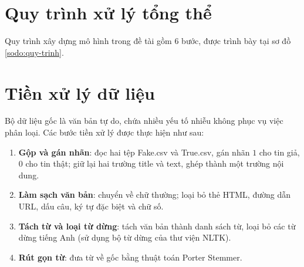 \section{Quy trình xử lý tổng thể}

Quy trình xây dựng mô hình trong đề tài gồm 6 bước, được trình bày tại sơ đồ \ref{sodo:quy-trinh}.

\begin{sodo}[H]
    \centering
    \label{sodo:quy-trinh}
\end{sodo}

\section{Tiền xử lý dữ liệu}

Bộ dữ liệu gốc là văn bản tự do, chứa nhiều yếu tố nhiễu không phục vụ việc phân loại. Các bước tiền xử lý được thực hiện như sau:

\begin{enumerate}
    \item \textbf{Gộp và gán nhãn}: đọc hai tệp Fake.csv và True.csv, gán nhãn $1$ cho tin giả, $0$ cho tin thật; giữ lại hai trường title và text, ghép thành một trường nội dung.
    \item \textbf{Làm sạch văn bản}: chuyển về chữ thường; loại bỏ thẻ HTML, đường dẫn URL, dấu câu, ký tự đặc biệt và chữ số.
    \item \textbf{Tách từ và loại từ dừng}: tách văn bản thành danh sách từ, loại bỏ các từ dừng tiếng Anh (sử dụng bộ từ dừng của thư viện NLTK).
    \item \textbf{Rút gọn từ}: đưa từ về gốc bằng thuật toán Porter Stemmer.
\end{enumerate}

